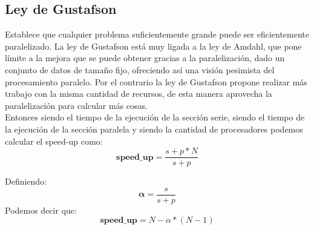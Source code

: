 \subsection{Ley de Gustafson}

Establece que cualquier problema suficientemente grande puede ser eficientemente
paralelizado. La ley de Gustafson está muy ligada a la ley de Amdahl, que pone
límite a la mejora que se puede obtener gracias a la paralelización, dado un
conjunto de datos de tamaño fijo, ofreciendo así una visión pesimista del
procesamiento paralelo. Por el contrario la ley de Gustafson  propone realizar
más trabajo con la misma cantidad de recursos, de esta manera aprovecha la
paralelización para calcular más cosas.\\

Entonces siendo  el tiempo de la ejecución de la sección serie, siendo
 el tiempo de la ejecución de la sección paralela y siendo  la
cantidad de procesadores podemos calcular el speed-up como:
\begin{equation}
    \textbf{speed\_up} = \dfrac{s+p*N}{s+p}
\end{equation}

Definiendo:
\begin{equation}
    \boldsymbol{\alpha} = \dfrac{s}{s+p}
\end{equation}
Podemos decir que:
\begin{equation}
    \textbf{speed\_up} = N - \alpha * (N-1)
\end{equation}

